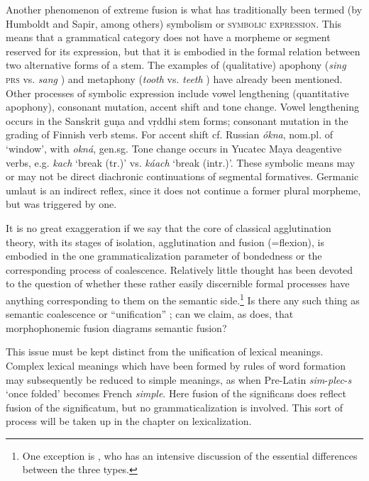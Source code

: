 Another phenomenon of extreme fusion is what has traditionally been termed (by Humboldt and Sapir, among others) symbolism or \textsc{symbolic expression}. This means that a grammatical category does not have a morpheme or segment reserved for its expression, but that it is embodied in the formal relation between two alternative forms of a stem. The examples of (qualitative) apophony (\textit{sing} \textsc{prs} vs. \textit{sang} \past) and metaphony (\textit{tooth} \glsg vs. \textit{teeth} \glpl) have already been mentioned. Other processes of symbolic expression include vowel lengthening (quantitative apophony), consonant mutation, accent shift and tone change. Vowel lengthening occurs in the Sanskrit guṇa and vṛddhi stem forms; consonant mutation in the grading of Finnish verb stems. For accent shift cf. Russian \textit{ókna}, nom.pl. of ‘window’, with \textit{okná}, gen.sg. Tone change occurs in Yucatec Maya deagentive verbs, e.g. \textit{kach} ‘break (tr.)’ vs. \textit{káach} ‘break (intr.)’. These symbolic means may or may not be direct diachronic continuations of segmental formatives. Germanic umlaut is an indirect reflex, since it does not continue a former plural morpheme, but was triggered by one.

It is no great exaggeration if we say that the core of classical agglutination theory, with its stages of isolation, agglutination and fusion (=flexion), is embodied in the one grammaticalization parameter of bondedness or the corresponding process of coalescence. Relatively little thought has been devoted to the question of whether these rather easily discernible formal processes have anything corresponding to them on the semantic side.\footnote{One exception is \citet[488--500]{Humboldt1836}, who has an  intensive discussion of the essential differences between the three types.} Is there any such thing as semantic coalescence or “unification” \citep[§3]{Žirmunskij1966}; can we claim, as \citet[§3]{Bybee1981} does, that morphophonemic fusion diagrams semantic fusion?

This issue must be kept distinct from the unification of lexical meanings. Complex lexical meanings which have been formed by rules of word formation may subsequently be reduced to simple meanings, as when Pre-Latin \textit{sim}{}-\textit{plec}{}-\textit{s} ‘once folded’ becomes French \textit{simple}. Here fusion of the significans does reflect fusion of the significatum, but no grammaticalization is involved. This sort of process will be taken up in the chapter on lexicalization.

